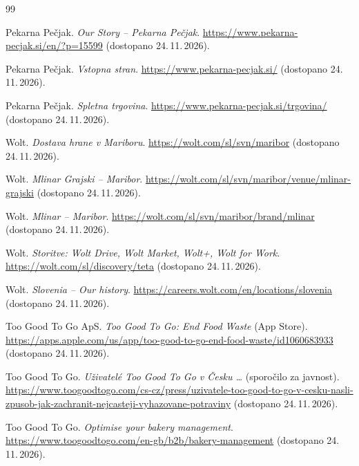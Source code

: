 \documentclass[11pt,a4paper]{article}
\begin{document}
\begin{thebibliography}{99}\sloppy

Pekarna Pečjak. \emph{Our Story -- Pekarna Pečjak}.
\url{https://www.pekarna-pecjak.si/en/?p=15599}
(dostopano 24.\,11.\,2026).

Pekarna Pečjak. \emph{Vstopna stran}.
\url{https://www.pekarna-pecjak.si/}
(dostopano 24.\,11.\,2026).

Pekarna Pečjak. \emph{Spletna trgovina}.
\url{https://www.pekarna-pecjak.si/trgovina/}
(dostopano 24.\,11.\,2026).

Wolt. \emph{Dostava hrane v Mariboru}.
\url{https://wolt.com/sl/svn/maribor}
(dostopano 24.\,11.\,2026).

Wolt. \emph{Mlinar Grajski -- Maribor}.
\url{https://wolt.com/sl/svn/maribor/venue/mlinar-grajski}
(dostopano 24.\,11.\,2026).

Wolt. \emph{Mlinar -- Maribor}.
\url{https://wolt.com/sl/svn/maribor/brand/mlinar}
(dostopano 24.\,11.\,2026).

Wolt. \emph{Storitve: Wolt Drive, Wolt Market, Wolt+, Wolt for Work}.
\url{https://wolt.com/sl/discovery/teta}
(dostopano 24.\,11.\,2026).

Wolt. \emph{Slovenia -- Our history}.
\url{https://careers.wolt.com/en/locations/slovenia}
(dostopano 24.\,11.\,2026).

Too Good To Go ApS. \emph{Too Good To Go: End Food Waste} (App Store).
\url{https://apps.apple.com/us/app/too-good-to-go-end-food-waste/id1060683933}
(dostopano 24.\,11.\,2026).

Too Good To Go. \emph{Uživatelé Too Good To Go v Česku \dots} (sporočilo za
javnost).
\url{https://www.toogoodtogo.com/cs-cz/press/uzivatele-too-good-to-go-v-cesku-nasli-zpusob-jak-zachranit-nejcasteji-vyhazovane-potraviny}
(dostopano 24.\,11.\,2026).

Too Good To Go. \emph{Optimise your bakery management}.
\url{https://www.toogoodtogo.com/en-gb/b2b/bakery-management}
(dostopano 24.\,11.\,2026).

\end{thebibliography}
\end{document}

